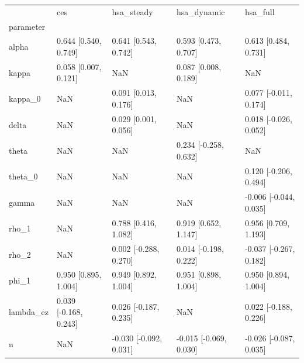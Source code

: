 \begin{tabular}{lllll}
\toprule
 & ces & hsa\_steady & hsa\_dynamic & hsa\_full \\
parameter &  &  &  &  \\
\midrule
alpha & 0.644 [0.540, 0.749] & 0.641 [0.543, 0.742] & 0.593 [0.473, 0.707] & 0.613 [0.484, 0.731] \\
kappa & 0.058 [0.007, 0.121] & NaN & 0.087 [0.008, 0.189] & NaN \\
kappa\_0 & NaN & 0.091 [0.013, 0.176] & NaN & 0.077 [-0.011, 0.174] \\
delta & NaN & 0.029 [0.001, 0.056] & NaN & 0.018 [-0.026, 0.052] \\
theta & NaN & NaN & 0.234 [-0.258, 0.632] & NaN \\
theta\_0 & NaN & NaN & NaN & 0.120 [-0.206, 0.494] \\
gamma & NaN & NaN & NaN & -0.006 [-0.044, 0.035] \\
rho\_1 & NaN & 0.788 [0.416, 1.082] & 0.919 [0.652, 1.147] & 0.956 [0.709, 1.193] \\
rho\_2 & NaN & 0.002 [-0.288, 0.270] & 0.014 [-0.198, 0.222] & -0.037 [-0.267, 0.182] \\
phi\_1 & 0.950 [0.895, 1.004] & 0.949 [0.892, 1.004] & 0.951 [0.898, 1.004] & 0.950 [0.894, 1.004] \\
lambda\_ez & 0.039 [-0.168, 0.243] & 0.026 [-0.187, 0.235] & NaN & 0.022 [-0.188, 0.226] \\
n & NaN & -0.030 [-0.092, 0.031] & -0.015 [-0.069, 0.030] & -0.026 [-0.087, 0.035] \\
\bottomrule
\end{tabular}
